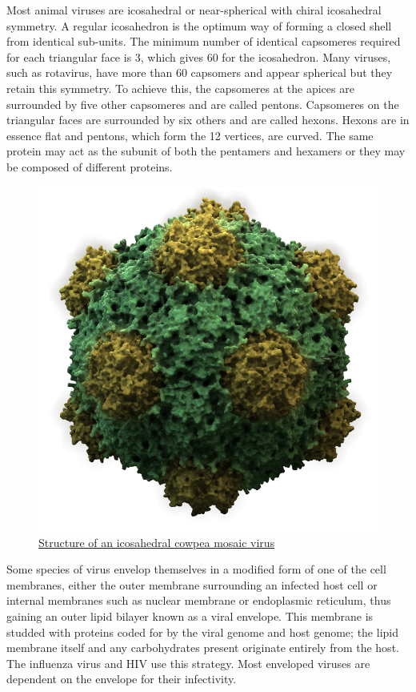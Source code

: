 Most animal viruses are icosahedral or near-spherical with chiral icosahedral symmetry. A regular icosahedron is the optimum way of forming a closed shell from identical sub-units. The minimum number of identical capsomeres required for each triangular face is 3, which gives 60 for the icosahedron. Many viruses, such as rotavirus, have more than 60 capsomers and appear spherical but they retain this symmetry. To achieve this, the capsomeres at the apices are surrounded by five other capsomeres and are called pentons. Capsomeres on the triangular faces are surrounded by six others and are called hexons. Hexons are in essence flat and pentons, which form the 12 vertices, are curved. The same protein may act as the subunit of both the pentamers and hexamers or they may be composed of different proteins.



\begin{figure}

{\centering \includegraphics[width=0.7\linewidth]{./figures/bacteria/CowpeaMosaicVirus3D} 

}

\caption{\href{https://commons.wikimedia.org/wiki/File:CowpeaMosaicVirus3D.png}{Structure of an icosahedral cowpea mosaic virus}}\label{fig:icosavirus}
\end{figure}

Some species of virus envelop themselves in a modified form of one of the cell membranes, either the outer membrane surrounding an infected host cell or internal membranes such as nuclear membrane or endoplasmic reticulum, thus gaining an outer lipid bilayer known as a viral envelope. This membrane is studded with proteins coded for by the viral genome and host genome; the lipid membrane itself and any carbohydrates present originate entirely from the host. The influenza virus and HIV use this strategy. Most enveloped viruses are dependent on the envelope for their infectivity.

